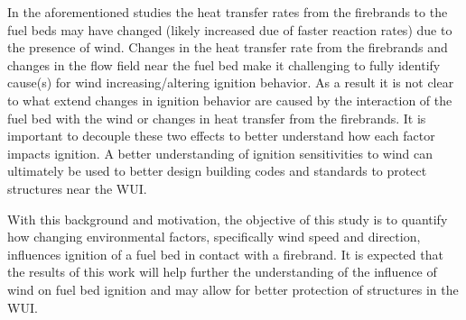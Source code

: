     In the aforementioned studies the heat transfer rates from the firebrands to the fuel beds may have changed (likely increased due of faster reaction rates) due to the presence of wind. Changes in the heat transfer rate from the firebrands and changes in the flow field near the fuel bed make it challenging to fully identify cause(s) for wind increasing/altering ignition behavior.
    As a result it is not clear to what extend changes in ignition behavior are caused by the interaction of the fuel bed with the wind or changes in heat transfer from the firebrands.
    It is important to decouple these two effects to better understand how each factor impacts ignition. A better understanding of ignition sensitivities to wind can ultimately be used to better design building codes and standards to protect structures near the WUI.

    
    
    
    
    With this background and motivation, the objective of this study is to quantify how changing environmental factors, specifically wind speed and direction, influences ignition of a fuel bed in contact with a firebrand. It is expected that the results of this work will help further the understanding of the influence of wind on fuel bed ignition and may allow for better protection of structures in the WUI.

